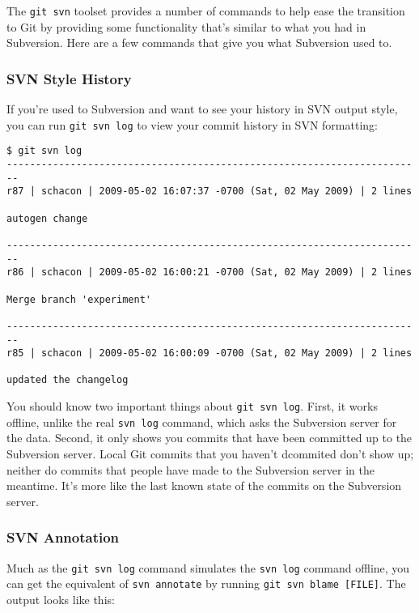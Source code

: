\documentclass[a4paper]{book}
\begin{document}
The \texttt{git svn} toolset provides a number of commands to help ease the transition to Git by providing some functionality that's similar to what you had in Subversion. Here are a few commands that give you what Subversion used to.

\subsubsection{SVN Style History}

If you're used to Subversion and want to see your history in SVN output style, you can run \texttt{git svn log} to view your commit history in SVN formatting:

\begin{shaded}\begin{verbatim}
$ git svn log
------------------------------------------------------------------------
r87 | schacon | 2009-05-02 16:07:37 -0700 (Sat, 02 May 2009) | 2 lines

autogen change

------------------------------------------------------------------------
r86 | schacon | 2009-05-02 16:00:21 -0700 (Sat, 02 May 2009) | 2 lines

Merge branch 'experiment'

------------------------------------------------------------------------
r85 | schacon | 2009-05-02 16:00:09 -0700 (Sat, 02 May 2009) | 2 lines

updated the changelog
\end{verbatim}\end{shaded}

You should know two important things about \texttt{git svn log}. First, it works offline, unlike the real \texttt{svn log} command, which asks the Subversion server for the data. Second, it only shows you commits that have been committed up to the Subversion server. Local Git commits that you haven't dcommited don't show up; neither do commits that people have made to the Subversion server in the meantime. It's more like the last known state of the commits on the Subversion server.

\subsubsection{SVN Annotation}

Much as the \texttt{git svn log} command simulates the \texttt{svn log} command offline, you can get the equivalent of \texttt{svn annotate} by running \texttt{git svn blame {[}FILE{]}}. The output looks like this:
\end{document}
